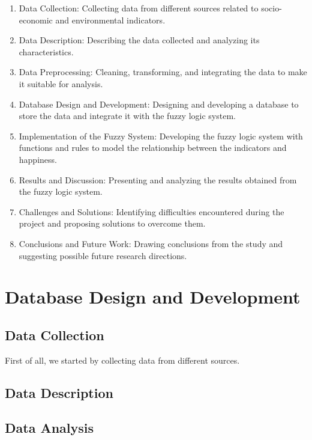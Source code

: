 \documentclass[fleqn,11pt]{article}
\begin{document}
\begin{enumerate}
	\item Data Collection: Collecting data from different sources related to socio-economic and environmental indicators.
	\item Data Description: Describing the data collected and analyzing its characteristics.
	\item Data Preprocessing: Cleaning, transforming, and integrating the data to make it suitable for analysis.
	\item Database Design and Development: Designing and developing a database to store the data and integrate it with the fuzzy logic system.
	\item Implementation of the Fuzzy System: Developing the fuzzy logic system with functions and rules to model the relationship between the indicators and happiness.
	\item Results and Discussion: Presenting and analyzing the results obtained from the fuzzy logic system.
	\item Challenges and Solutions: Identifying difficulties encountered during the project and proposing solutions to overcome them.
	\item Conclusions and Future Work: Drawing conclusions from the study and suggesting possible future research directions.
\end{enumerate}



\section{Database Design and Development}


\subsection{Data Collection}

First of all, we started by collecting data from different sources. 

\subsection{Data Description}

\subsection{Data Analysis}
\end{document}
